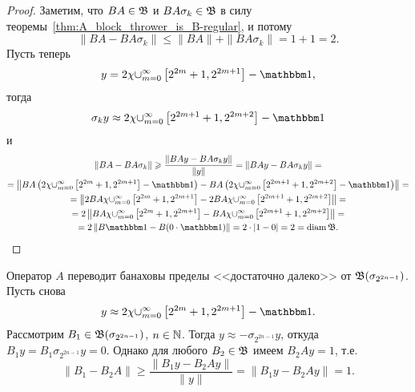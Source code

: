 \begin{proof}
	Заметим, что $BA\in\mathfrak{B}$ и $BA\sigma_k\in\mathfrak{B}$ в силу теоремы~\ref{thm:A_block_thrower_is_B-regular}, и потому
	\begin{equation}
		\|BA-BA\sigma_k\| \leq \|BA\|+\|BA\sigma_k\| = 1+1 = 2
		.
	\end{equation}
	Пусть теперь
	\begin{equation}
		y = 2\chi {\cup_{m=0}^{\infty}\left[2^{2 m}+1, 2^{2 m+1}\right]} - \one
		,
	\end{equation}
	тогда
	\begin{equation}
		\sigma_k y \approx 2\chi {\cup_{m=0}^{\infty}\left[2^{2 m+1}+1, 2^{2 m+2}\right]} - \one
	\end{equation}
	и
	\begin{multline}
		\|BA-BA\sigma_k\| \geq \dfrac{\| BAy-BA\sigma_ky \|}{\|y\|} = \| BAy-BA\sigma_ky \| =
		\\=
		\left\| BA\left(2\chi {\cup_{m=0}^{\infty}\left[2^{2 m}+1, 2^{2 m+1}\right]} - \one\right)-
		BA\left(2\chi {\cup_{m=0}^{\infty}\left[2^{2 m+1}+1, 2^{2 m+2}\right]} - \one\right) \right\|=
		\\=
		\left\| 2BA\chi {\cup_{m=0}^{\infty}\left[2^{2 m}+1, 2^{2 m+1}\right]}-
		2BA\chi {\cup_{m=0}^{\infty}\left[2^{2 m+1}+1, 2^{2 m+2}\right]}  \right\|=
		\\=
		2\left\| BA\chi {\cup_{m=0}^{\infty}\left[2^{2 m}+1, 2^{2 m+1}\right]}-
		BA\chi {\cup_{m=0}^{\infty}\left[2^{2 m+1}+1, 2^{2 m+2}\right]}  \right\|=
		\\=
		2\left\| B \one- B (0\cdot \one)  \right\|=
		2\cdot| 1- 0  |= 2 = \diam \B
		.
		\end{multline}
\end{proof}

\begin{remark}
	Оператор $A$ переводит банаховы пределы <<достаточно далеко>> от $\mathfrak{B}(\sigma_{2^{2n-1}})$.
	Пусть снова
	\begin{equation}
		y \approx 2\chi {\cup_{m=0}^{\infty}\left[2^{2 m}+1, 2^{2 m+1}\right]} - \one
		.
	\end{equation}
	Рассмотрим $B_1 \in \mathfrak{B}(\sigma_{2^{2n-1}})$, $n\in\mathbb{N}$.
	Тогда  $y \approx - \sigma_{2^{2n-1}} y$,
	откуда $B_1 y = B_1 \sigma_{2^{2n-1}} y = 0$.
	Однако для любого $B_2 \in \mathfrak{B}$ имеем $B_2 A y = 1$,
	т.е.
	\begin{equation}
		\|B_1 - B_2 A\| \geq \dfrac{\|B_1y - B_2 Ay\|}{\|y\|} = \|B_1y - B_2 Ay\| = 1
		.
	\end{equation}
\end{remark}

